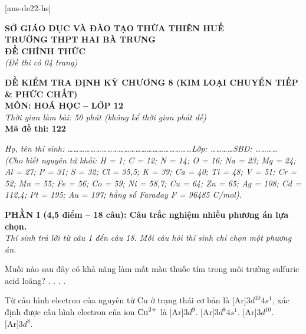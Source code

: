 \documentclass[11pt,a4paper]{article}
\def\loigiai#1{}
\begin{document}
[ans-de22-hs]

\noindent
\begin{minipage}[t]{0.48\textwidth}
	\textbf{SỞ GIÁO DỤC VÀ ĐÀO TẠO THỪA THIÊN HUẾ}\\
	\textbf{TRƯỜNG THPT HAI BÀ TRƯNG}\\
	\textbf{ĐỀ CHÍNH THỨC}\\
	\textit{(Đề thi có 04 trang)}
\end{minipage}\hfill
\begin{minipage}[t]{0.48\textwidth}
	\raggedleft
	\textbf{\color{mainGreen}ĐỀ KIỂM TRA ĐỊNH KỲ CHƯƠNG 8 (KIM LOẠI CHUYỂN TIẾP \& PHỨC CHẤT)}\\
	\textbf{MÔN: HOÁ HỌC -- LỚP 12}\\
	\textit{Thời gian làm bài: 50 phút (không kể thời gian phát đề)}\\
	\textbf{Mã đề thi: 122}
\end{minipage}


\vspace{1pt}
\noindent\textit{Họ, tên thí sinh: \dots\dots\dots\dots\dots\dots\dots\dots\dots\dots\dots\dots\dots\dots\dots\dots\dots\dots\dots\dots\dots\dots Lớp: \dots\dots\dots\dots SBD: \dots\dots\dots\dots}\\
\noindent\textit{(Cho biết nguyên tử khối: H = 1; C = 12; N = 14; O = 16; Na = 23; Mg = 24; Al = 27; P = 31; S = 32; Cl = 35,5; K = 39; Ca = 40; Ti = 48; V = 51; Cr = 52; Mn = 55; Fe = 56; Co = 59; Ni = 58,7; Cu = 64; Zn = 65; Ag = 108; Cd = 112,4; Pt = 195; Au = 197; hằng số Faraday F = 96485 C/mol).}

\vspace{1pt}
\noindent
\textbf{PHẦN I (4,5 điểm -- 18 câu): Câu trắc nghiệm nhiều phương án lựa chọn.}\\
\textit{Thí sinh trả lời từ câu 1 đến câu 18. Mỗi câu hỏi thí sinh chỉ chọn một phương án.}

\begin{ex}
Muối nào sau đây có khả năng làm mất màu thuốc tím trong môi trường sulfuric acid loãng?
\choice
{.}
{.}
{.}
{.}
\loigiai{}
\end{ex}

\begin{ex}
Từ cấu hình electron của nguyên tử Cu ở trạng thái cơ bản là $\text{[Ar]}3d^{10}4s^1$, xác định được cấu hình electron của ion $\ce{Cu^2+}$ là
\choice
{$\text{[Ar]}3d^9$.}
{$\text{[Ar]}3d^8 4s^1$.}
{$\text{[Ar]}3d^{10}$.}
{$\text{[Ar]}3d^8$.}
\loigiai{}
\end{ex}
\end{document}
